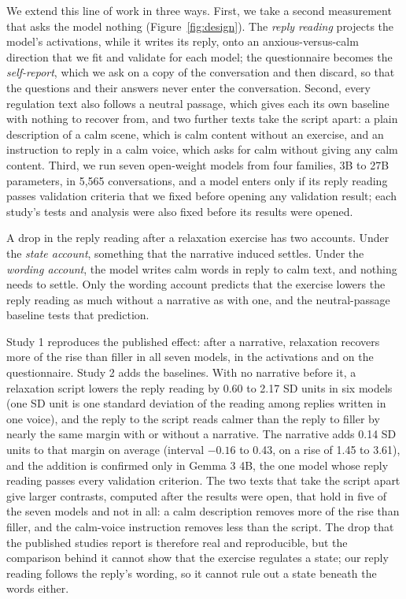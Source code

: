 We extend this line of work in three ways.
First, we take a second measurement that asks the model nothing (Figure~\ref{fig:design}).
The \emph{reply reading} projects the model's activations, while it writes its reply, onto an
anxious-versus-calm direction that we fit and validate for each model; the questionnaire becomes the
\emph{self-report}, which we ask on a copy of the conversation and then discard, so that the questions
and their answers never enter the conversation.
Second, every regulation text also follows a neutral passage, which gives each its own baseline with
nothing to recover from, and two further texts take the script apart: a plain description of a calm
scene, which is calm content without an exercise, and an instruction to reply in a calm voice, which
asks for calm without giving any calm content.
Third, we run seven open-weight models from four families, 3B to 27B parameters, in 5,565
conversations, and a model enters only if its reply reading passes validation criteria that we fixed
before opening any validation result; each study's tests and analysis were also fixed before its
results were opened.

A drop in the reply reading after a relaxation exercise has two accounts.
Under the \emph{state account}, something that the narrative induced settles.
Under the \emph{wording account}, the model writes calm words in reply to calm text, and nothing
needs to settle.
Only the wording account predicts that the exercise lowers the reply reading as much without a
narrative as with one, and the neutral-passage baseline tests that prediction.

Study 1 reproduces the published effect: after a narrative, relaxation recovers more of the rise
than filler in all seven models, in the activations and on the questionnaire.
Study 2 adds the baselines.
With no narrative before it, a relaxation script lowers the reply reading by 0.60 to 2.17 SD units in
six models (one SD unit is one standard deviation of the reading among replies written in one voice), and the reply to the script reads calmer than the reply to filler by nearly the same
margin with or without a narrative.
The narrative adds 0.14 SD units to that margin on average (interval $-0.16$ to 0.43, on a rise of
1.45 to 3.61), and the addition is confirmed only in Gemma 3 4B, the one model whose reply reading
passes every validation criterion.
The two texts that take the script apart give larger contrasts, computed after the results were
open, that hold in five of the seven models and not in all: a calm description removes more of the rise than filler, and the calm-voice
instruction removes less than the script.
The drop that the published studies report is therefore real and reproducible, but the comparison
behind it cannot show that the exercise regulates a state; our reply reading follows the reply's
wording, so it cannot rule out a state beneath the words either.

